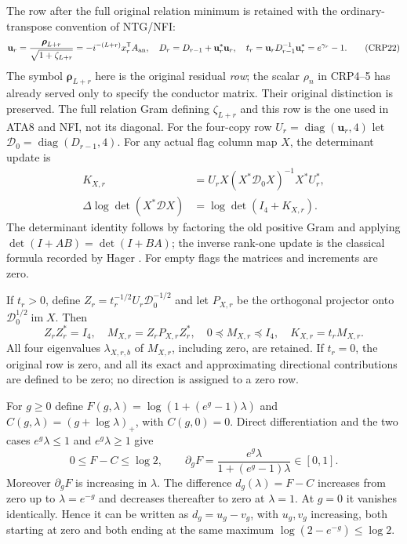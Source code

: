 \documentclass[11pt,a4paper]{article}
\begin{document}
The row after the full original relation minimum is retained with
the ordinary-transpose convention of NTG/NFI:
\[
\mathbf u_r=\frac{\boldsymbol\rho_{L+r}}{\sqrt{1+\zeta_{L+r}}}
   =-i^{-(L+r)}x_r^{\mathsf T}A_{\rm an},\quad
D_r=D_{r-1}+\mathbf u_r^*\mathbf u_r,\quad
t_r=\mathbf u_rD_{r-1}^{-1}\mathbf u_r^*=e^{\gamma_r}-1.\tag{CRP22}
\]
The symbol $\boldsymbol\rho_{L+r}$ here is the original residual \emph{row};
the scalar $\rho_n$ in CRP4--5 has already served only to specify the
conductor matrix. Their original distinction is preserved.
The full relation Gram defining $\zeta_{L+r}$ and this row is the
one used in ATA8 and NFI, not its diagonal. For the four-copy row
$U_r=\operatorname{diag}(\mathbf u_r,4)$ let
$\mathcal D_0=\operatorname{diag}(D_{r-1},4)$.
For any actual flag column map $X$, the determinant update is
\[
\begin{split}
K_{X,r}&=U_rX(X^*\mathcal D_0X)^{-1}X^*U_r^*,\\
\Delta\log\det(X^*\mathcal D X)&=\log\det(I_4+K_{X,r}).
\end{split}\tag{CRP23}
\]
The determinant identity follows by factoring the old positive Gram
and applying $\det(I+AB)=\det(I+BA)$; the inverse rank-one update is
the classical formula recorded by Hager \cite[p.~221, (2)]{human:hager1989}.
For empty flags the matrices and increments are zero.

If $t_r>0$, define
$Z_r=t_r^{-1/2}U_r\mathcal D_0^{-1/2}$ and let $P_{X,r}$ be the
orthogonal projector onto $\mathcal D_0^{1/2}\operatorname{im}X$.
Then
\[
Z_rZ_r^*=I_4,\quad M_{X,r}=Z_rP_{X,r}Z_r^*,\quad
0\preceq M_{X,r}\preceq I_4,\quad K_{X,r}=t_rM_{X,r}.
\tag{CRP24}
\]
All four eigenvalues $\lambda_{X,r,b}$ of $M_{X,r}$, including zero,
are retained. If $t_r=0$, the original row is zero, and all its exact
and approximating directional contributions are defined to be zero;
no direction is assigned to a zero row.

For $g\ge0$ define $F(g,\lambda)=\log(1+(e^g-1)\lambda)$ and
$C(g,\lambda)=(g+\log\lambda)_+$, with $C(g,0)=0$.
Direct differentiation and the two cases $e^g\lambda\le1$ and
$e^g\lambda\ge1$ give
\[
0\le F-C\le\log2,\qquad
\partial_gF=\frac{e^g\lambda}{1+(e^g-1)\lambda}\in[0,1].
\tag{CRP25}
\]
Moreover $\partial_gF$ is increasing in $\lambda$. The difference
$d_g(\lambda)=F-C$ increases from zero up to
$\lambda=e^{-g}$ and decreases thereafter to zero at $\lambda=1$.
At $g=0$ it vanishes identically. Hence it can be written as
$d_g=u_g-v_g$, with $u_g,v_g$ increasing, both starting at zero and
both ending at the same maximum $\log(2-e^{-g})\le\log2$.
\end{document}
